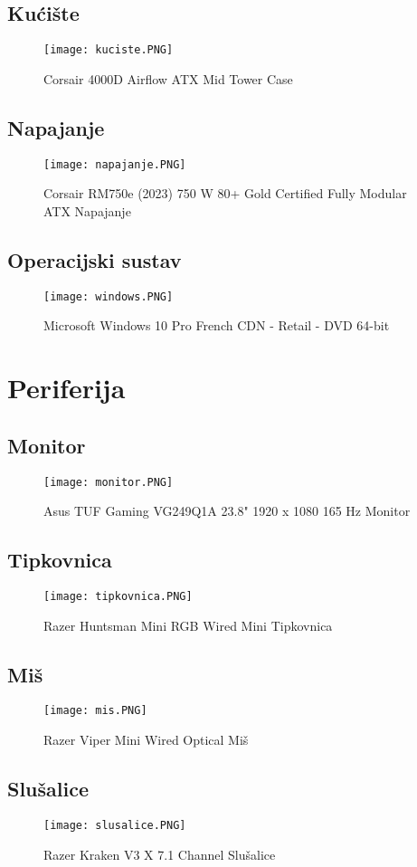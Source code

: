 \documentclass{report}
\begin{document}
\subsection{Kućište}
\begin{figure}[h]
    \texttt{[image: kuciste.PNG]}
    \caption{Corsair 4000D Airflow ATX Mid Tower Case}
\end{figure}
\subsection{Napajanje}
\begin{figure}[h]
    \texttt{[image: napajanje.PNG]}
    \caption{Corsair RM750e (2023) 750 W 80+ Gold Certified Fully Modular ATX Napajanje}
\end{figure}
\subsection{Operacijski sustav}
\begin{figure}[h]
    \texttt{[image: windows.PNG]}
    \caption{Microsoft Windows 10 Pro French CDN - Retail - DVD 64-bit}
\end{figure}

\section{Periferija}
\subsection{Monitor}
\begin{figure}[h]
    \texttt{[image: monitor.PNG]}
    \caption{Asus TUF Gaming VG249Q1A 23.8" 1920 x 1080 165 Hz Monitor}
\end{figure}
\subsection{Tipkovnica}
\begin{figure}[h]
    \texttt{[image: tipkovnica.PNG]}
    \caption{Razer Huntsman Mini RGB Wired Mini Tipkovnica}
\end{figure}
\subsection{Miš}
\begin{figure}[h]
    \texttt{[image: mis.PNG]}
    \caption{Razer Viper Mini Wired Optical Miš}
\end{figure}
\subsection{Slušalice}
\begin{figure}[h]
    \texttt{[image: slusalice.PNG]}
    \caption{Razer Kraken V3 X 7.1 Channel Slušalice}
\end{figure}
\end{document}
